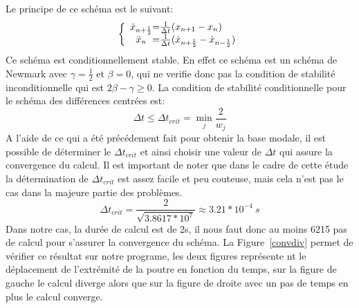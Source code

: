 \documentclass[]{article}
\begin{document}
Le principe de ce schéma est le suivant:
\[
\left \{
\begin{array}{c @{=} l}
    \dot{x}_{n+\frac{1}{2}} & \frac{1}{\Delta t} ( x_{n+1} - x_{n} ) \\
    \ddot{x}_{n} & \frac{1}{\Delta t} ( \dot{x}_{n+\frac{1}{2}} -
\dot{x}_{n-\frac{1}{2}} ) \\
\end{array}
\right.
\]
Ce schéma est conditionnellement stable. En effet ce schéma est un schéma de
Newmark avec $\gamma=\frac{1}{2}$ et $\beta=0$, qui ne verifie donc pas la
condition de stabilité inconditionnelle qui est $2\beta-\gamma\geq0$. La
condition de stabilité conditionnelle pour le schéma des différences centrées
est:
$$ \Delta t \leq \Delta t_{crit}= \min_{j} \frac{2}{w_{j}}$$
A l'aide de ce qui a été précédement fait pour obtenir la base modale, il est
possible de déterminer le $\Delta t_{crit}$ et ainsi choisir une valeur de
$\Delta t$ qui assure la convergence du calcul. Il est important de noter que
dans le cadre de cette étude la détermination de $\Delta t_{crit}$ est assez
facile et peu couteuse, mais cela n'est pas le cas dans la majeure partie des
problèmes.
$$
\Delta t_{crit} = \frac{2}{\sqrt{3.8617*10^{7}}} \approx 3.21*10^{-4}\ s
$$
Dans notre cas, la durée de calcul est de 2s, il nous faut donc au moins 6215
pas de calcul pour s'assurer la convergence du schéma. La Figure~\ref{convdiv}
permet de vérifier ce résultat sur notre programe, les deux figures représente
nt le déplacement de l'extrémité de la poutre en fonction du temps, sur la
figure de gauche le calcul diverge alors que sur la figure de droite avec un
pas de temps en plus le calcul converge. 
\end{document}
